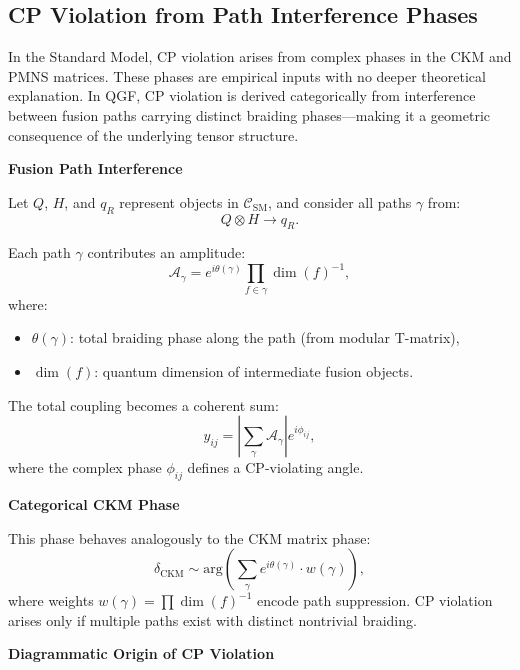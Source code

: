 \documentclass[11pt]{article}
\def\left{}
\def\right{}
\begin{document}
\subsection{CP Violation from Path Interference Phases}

In the Standard Model, CP violation arises from complex phases in the CKM and PMNS matrices. These phases are empirical inputs with no deeper theoretical explanation. In QGF, CP violation is derived categorically from interference between fusion paths carrying distinct braiding phases—making it a geometric consequence of the underlying tensor structure.

\vspace{0.5em}
\noindent\textbf{Fusion Path Interference}

Let \( Q \), \( H \), and \( q_R \) represent objects in \( \mathcal{C}_{\text{SM}} \), and consider all paths \( \gamma \) from:
\[
Q \otimes H \rightarrow q_R.
\]

Each path \( \gamma \) contributes an amplitude:
\[
\mathcal{A}_\gamma = e^{i \theta(\gamma)} \prod_{f \in \gamma} \dim(f)^{-1},
\]
where:
\begin{itemize}
  \item \( \theta(\gamma) \): total braiding phase along the path (from modular T-matrix),
  \item \( \dim(f) \): quantum dimension of intermediate fusion objects.
\end{itemize}

The total coupling becomes a coherent sum:
\[
y_{ij} = \left| \sum_{\gamma} \mathcal{A}_\gamma \right| e^{i \phi_{ij}},
\]
where the complex phase \( \phi_{ij} \) defines a CP-violating angle.

\vspace{0.5em}
\noindent\textbf{Categorical CKM Phase}

This phase behaves analogously to the CKM matrix phase:
\[
\delta_{\text{CKM}} \sim \text{arg} \left( \sum_{\gamma} e^{i \theta(\gamma)} \cdot w(\gamma) \right),
\]
where weights \( w(\gamma) = \prod \dim(f)^{-1} \) encode path suppression. CP violation arises only if multiple paths exist with distinct nontrivial braiding.

\vspace{0.5em}
\noindent\textbf{Diagrammatic Origin of CP Violation}
\end{document}
